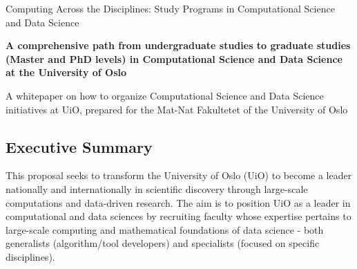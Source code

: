 \documentclass[%
oneside,                 %
final,                   %
10pt]{article}
\begin{document}

\newcommand{\exercisesection}[1]{\subsection*{#1}}






\thispagestyle{empty}

\begin{center}
{\LARGE\bf
\begin{spacing}{1.25}
Computing Across the Disciplines: Study Programs in Computational Science and Data Science
\end{spacing}
}
\end{center}


\begin{center}
{\bf A comprehensive path from undergraduate studies to graduate studies (Master and PhD levels) in Computational Science and Data Science at the University of Oslo }\\ [0mm]
\end{center}

\begin{center}
\end{center}
    

\begin{center}
A whitepaper on how to organize Computational Science and Data Science initiatives at UiO, prepared for the Mat-Nat Fakultetet of the University of Oslo
\end{center}

\vspace{1cm}


\subsection*{Executive Summary}

This proposal seeks to transform the University of Oslo (UiO) to
become a leader nationally and
internationally in scientific discovery through large-scale
computations and data-driven research. The aim is to position UiO as a leader in
computational and data sciences by recruiting faculty whose expertise pertains
to large-scale computing and mathematical foundations of data science - both generalists (algorithm/tool developers) and specialists
(focused on specific disciplines).  
\end{document}
